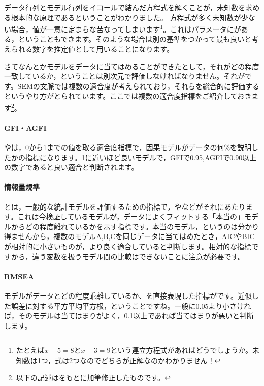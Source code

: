 \documentclass{ltjsbook}
\begin{document}
データ行列とモデル行列をイコールで結んだ方程式を解くことが，未知数を求める根本的な原理であるということがわかりました。
方程式が多く未知数が少ない場合，値が一意に定まらな苦なってしまいます\footnote{たとえば$x+5=8$と$x-3=9$という連立方程式があればどうでしょうか。未知数は1つ，式は2つなのでどちらが正解なのかわかりません！}。これはパラメータにがある，ということもできます。そのような場合は別の基準をつかって最も良いと考えられる数字を推定値として用いることになります。

さてなんとかモデルをデータに当てはめることができたとして，それがどの程度一致しているか，ということは別次元で評価しなければなりません。それがです。SEMの文脈では複数の適合度が考えられており，それらを総合的に評価するというやり方がとられています。ここでは複数の適合度指標をご紹介しておきます\footnote{以下の記述は\citet{Kosugi2014Mplus}をもとに加筆修正したものです。}。

\paragraph{GFI・AGFI} やは，0から1までの値を取る適合度指標で，因果モデルがデータの何\%を説明したかの指標になります。1に近いほど良いモデルで，GFIで0.95,AGFIで0.90以上の数字であると良い適合と判断されます。

\paragraph{情報量規準}
とは，一般的な統計モデルを評価するための指標で，やなどがそれにあたります。これは今検証しているモデルが，データによくフィットする「本当の」モデルからどの程度離れているかを示す指標です。本当のモデル，というのは分かり得ませんから，複数のモデルA,B,Cを同じデータに当てはめたとき，AICやBICが相対的に小さいものが，より良く適合していると判断します。相対的な指標ですから，違う変数を扱うモデル間の比較はできないことに注意が必要です。
\paragraph{RMSEA}
モデルがデータとどの程度乖離しているか、を直接表現した指標がです。近似した誤差に対する平方平均平方根，ということですね。一般に0.05より小さければ，そのモデルは当てはまりがよく，0.1以上であれば当てはまりが悪いと判断します。
\end{document}
